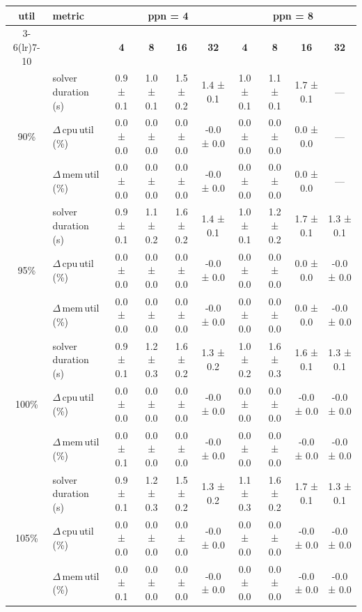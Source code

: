 \begin{tabular}{@{}c l *{8}{c}@{}}
\toprule
\multirow{2}{*}{\textbf{util}} & \multirow{2}{*}{\textbf{metric}} &\multicolumn{4}{c}{\textbf{ppn = 4}} & \multicolumn{4}{c}{\textbf{ppn = 8}}\\
\cmidrule(lr){3-6}\cmidrule(lr){7-10}
 &  & \textbf{4} & \textbf{8} & \textbf{16} & \textbf{32} & \textbf{4} & \textbf{8} & \textbf{16} & \textbf{32}\\
\midrule
\multirow{3}{*}{90\%}
& solver\,duration\,(s) & 0.9 ± 0.1 & 1.0 ± 0.1 & 1.5 ± 0.2 & 1.4 ± 0.1 & 1.0 ± 0.1 & 1.1 ± 0.1 & 1.7 ± 0.1 & \multicolumn{1}{c}{—} \\
& $\Delta$\,cpu\,util\,(\%) & 0.0 ± 0.0 & 0.0 ± 0.0 & 0.0 ± 0.0 & -0.0 ± 0.0 & 0.0 ± 0.0 & 0.0 ± 0.0 & 0.0 ± 0.0 & \multicolumn{1}{c}{—} \\
& $\Delta$\,mem\,util\,(\%) & 0.0 ± 0.0 & 0.0 ± 0.0 & 0.0 ± 0.0 & -0.0 ± 0.0 & 0.0 ± 0.0 & 0.0 ± 0.0 & 0.0 ± 0.0 & \multicolumn{1}{c}{—} \\
\midrule
\multirow{3}{*}{95\%}
& solver\,duration\,(s) & 0.9 ± 0.1 & 1.1 ± 0.2 & 1.6 ± 0.2 & 1.4 ± 0.1 & 1.0 ± 0.1 & 1.2 ± 0.2 & 1.7 ± 0.1 & 1.3 ± 0.1 \\
& $\Delta$\,cpu\,util\,(\%) & 0.0 ± 0.0 & 0.0 ± 0.0 & 0.0 ± 0.0 & -0.0 ± 0.0 & 0.0 ± 0.0 & 0.0 ± 0.0 & 0.0 ± 0.0 & -0.0 ± 0.0 \\
& $\Delta$\,mem\,util\,(\%) & 0.0 ± 0.0 & 0.0 ± 0.0 & 0.0 ± 0.0 & -0.0 ± 0.0 & 0.0 ± 0.0 & 0.0 ± 0.0 & 0.0 ± 0.0 & -0.0 ± 0.0 \\
\midrule
\multirow{3}{*}{100\%}
& solver\,duration\,(s) & 0.9 ± 0.1 & 1.2 ± 0.3 & 1.6 ± 0.2 & 1.3 ± 0.2 & 1.0 ± 0.2 & 1.6 ± 0.3 & 1.6 ± 0.1 & 1.3 ± 0.1 \\
& $\Delta$\,cpu\,util\,(\%) & 0.0 ± 0.0 & 0.0 ± 0.0 & 0.0 ± 0.0 & -0.0 ± 0.0 & 0.0 ± 0.0 & 0.0 ± 0.0 & -0.0 ± 0.0 & -0.0 ± 0.0 \\
& $\Delta$\,mem\,util\,(\%) & 0.0 ± 0.1 & 0.0 ± 0.0 & 0.0 ± 0.0 & -0.0 ± 0.0 & 0.0 ± 0.0 & 0.0 ± 0.0 & -0.0 ± 0.0 & -0.0 ± 0.0 \\
\midrule
\multirow{3}{*}{105\%}
& solver\,duration\,(s) & 0.9 ± 0.1 & 1.2 ± 0.3 & 1.5 ± 0.2 & 1.3 ± 0.2 & 1.1 ± 0.3 & 1.6 ± 0.2 & 1.7 ± 0.1 & 1.3 ± 0.1 \\
& $\Delta$\,cpu\,util\,(\%) & 0.0 ± 0.0 & 0.0 ± 0.0 & 0.0 ± 0.0 & -0.0 ± 0.0 & 0.0 ± 0.0 & 0.0 ± 0.0 & -0.0 ± 0.0 & -0.0 ± 0.0 \\
& $\Delta$\,mem\,util\,(\%) & 0.0 ± 0.1 & 0.0 ± 0.0 & 0.0 ± 0.0 & -0.0 ± 0.0 & 0.0 ± 0.0 & 0.0 ± 0.0 & -0.0 ± 0.0 & -0.0 ± 0.0 \\
\bottomrule
\end{tabular}
